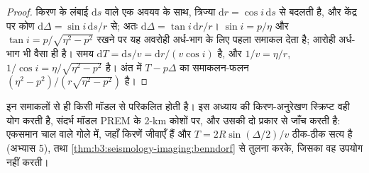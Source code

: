 \begin{proof}
किरण के लंबाई $\mathrm ds$ वाले एक अवयव के साथ, त्रिज्या
$\mathrm dr = \cos i\,\mathrm ds$ से बदलती है, और केंद्र पर कोण
$\mathrm d\Delta = \sin i\,\mathrm ds/r$ से; अतः $\mathrm d\Delta = \tan i\,\mathrm dr/r$।
$\sin i = p/\eta$ और $\tan i = p/\sqrt{\eta^2 - p^2}$ रखने पर यह
अवरोही अर्ध-भाग के लिए पहला समाकल देता है; आरोही अर्ध-भाग भी वैसा ही है। समय
$\mathrm dT = \mathrm ds/v = \mathrm dr/(v\cos i)$ है, और $1/v = \eta/r$,
$1/\cos i = \eta/\sqrt{\eta^2 - p^2}$ है। अंत में $T - p\Delta$ का समाकलन-फलन
$(\eta^2 - p^2)/(r\sqrt{\eta^2 - p^2})$ है।
\end{proof}

इन समाकलों से ही किसी मॉडल से  परिकलित होती है। इस अध्याय की
किरण-अनुरेखण स्क्रिप्ट वही योग करती है, संदर्भ मॉडल PREM के
2-km कोशों पर, %
और उसकी दो प्रकार से जाँच करती है: एकसमान चाल वाले गोले में, जहाँ किरणें
जीवाएँ हैं और $T = 2R\sin(\Delta/2)/v$ ठीक-ठीक सत्य है (अभ्यास 5), तथा
\cref{thm:b3:seismology-imaging:benndorf} से तुलना करके, जिसका वह उपयोग नहीं करती।

